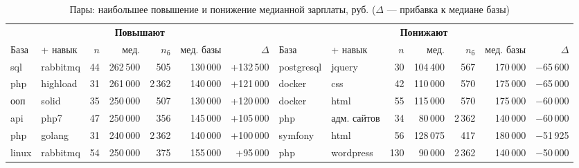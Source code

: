 \documentclass[11pt,a4paper]{article}
\begin{document}
\begin{table}[H]
\centering
\scriptsize
\setlength{\tabcolsep}{3pt}
\caption{Пары: наибольшее повышение и понижение медианной зарплаты, руб. ($\Delta$ --- прибавка к медиане базы)}
\begin{tabular}{@{}llrrrrr|llrrrrr@{}}
\toprule
\multicolumn{7}{c|}{\textcolor{ok}{\textbf{Повышают}}} & \multicolumn{7}{c}{\textcolor{bad}{\textbf{Понижают}}} \\
База & + навык & $n$ & мед. & $n_{\text{б}}$ & мед. базы & $\Delta$ & База & + навык & $n$ & мед. & $n_{\text{б}}$ & мед. базы & $\Delta$ \\
\midrule
sql & rabbitmq & 44 & 262\,500 & 505 & 130\,000 & +132\,500 & postgresql & jquery & 30 & 104\,400 & 567 & 170\,000 & $-$65\,600 \\
php & highload & 31 & 261\,000 & 2\,362 & 140\,000 & +121\,000 & docker & css & 42 & 110\,000 & 570 & 175\,000 & $-$65\,000 \\
ооп & solid & 35 & 250\,000 & 507 & 130\,000 & +120\,000 & docker & html & 55 & 115\,000 & 570 & 175\,000 & $-$60\,000 \\
api & php7 & 47 & 250\,000 & 356 & 145\,000 & +105\,000 & php & адм. сайтов & 34 & 80\,000 & 2\,362 & 140\,000 & $-$60\,000 \\
php & golang & 31 & 240\,000 & 2\,362 & 140\,000 & +100\,000 & symfony & html & 56 & 128\,075 & 417 & 180\,000 & $-$51\,925 \\
linux & rabbitmq & 54 & 250\,000 & 375 & 155\,000 & +95\,000 & php & wordpress & 130 & 90\,000 & 2\,362 & 140\,000 & $-$50\,000 \\
\bottomrule
\end{tabular}
\end{table}
\end{document}
